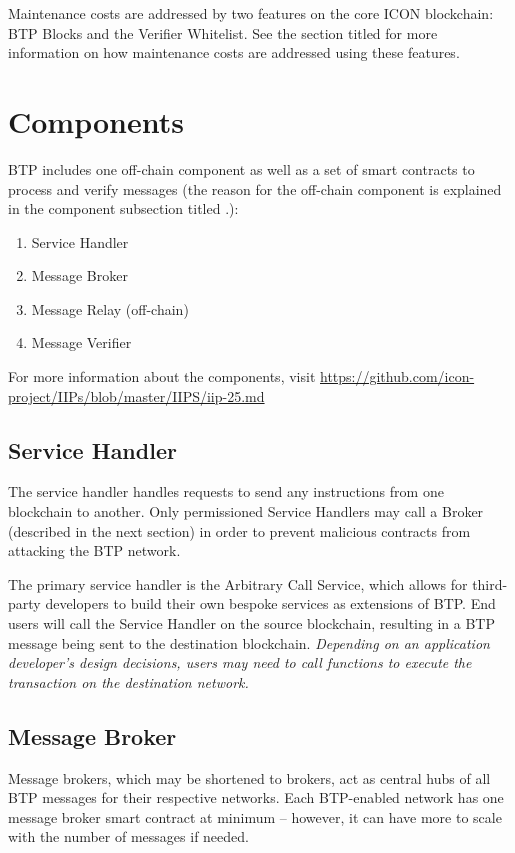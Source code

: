 \documentclass{article}
\begin{document}
Maintenance costs are addressed by two features on the core ICON blockchain: BTP Blocks and the Verifier Whitelist. See the section titled \textit{} for more information on how maintenance costs are addressed using these features.


\section{Components}
\label{sec:components}

BTP includes one off-chain component as well as a set of smart contracts to process and verify messages (the reason for the off-chain component is explained in the component subsection titled \textit{}.):

\begin{enumerate}
\item Service Handler
\item Message Broker
\item Message Relay (off-chain)
\item Message Verifier
\end{enumerate}

For more information about the components, visit \url{https://github.com/icon-project/IIPs/blob/master/IIPS/iip-25.md}

\subsection{Service Handler}
The service handler handles requests to send any instructions from one blockchain to another. Only permissioned Service Handlers may call a Broker (described in the next section) in order to prevent malicious contracts from attacking the BTP network.

The primary service handler is the Arbitrary Call Service, which allows for third-party developers to build their own bespoke services as extensions of BTP. End users will call the Service Handler on the source blockchain, resulting in a BTP message being sent to the destination blockchain. \textit{Depending on an application developer’s design decisions, users may need to call functions to execute the transaction on the destination network.}

\subsection{Message Broker}
Message brokers, which may be shortened to brokers, act as central hubs of all BTP messages for their respective networks. Each BTP-enabled network has one message broker smart contract at minimum – however, it can have more to scale with the number of messages if needed.
\end{document}
